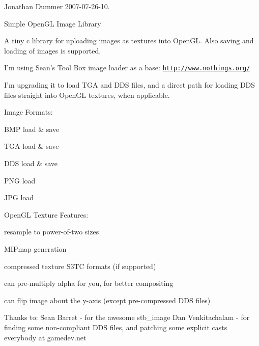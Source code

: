 Jonathan Dummer 2007-\/07-\/26-\/10.

Simple Open\+G\+L Image Library

A tiny c library for uploading images as textures into Open\+G\+L. Also saving and loading of images is supported.

I'm using Sean's Tool Box image loader as a base\+: \href{http://www.nothings.org/}{\tt http\+://www.\+nothings.\+org/}

I'm upgrading it to load T\+G\+A and D\+D\+S files, and a direct path for loading D\+D\+S files straight into Open\+G\+L textures, when applicable.

Image Formats\+:
\begin{DoxyItemize}
\item B\+M\+P load \& save
\item T\+G\+A load \& save
\item D\+D\+S load \& save
\item P\+N\+G load
\item J\+P\+G load
\end{DoxyItemize}

Open\+G\+L Texture Features\+:
\begin{DoxyItemize}
\item resample to power-\/of-\/two sizes
\item M\+I\+Pmap generation
\item compressed texture S3\+T\+C formats (if supported)
\item can pre-\/multiply alpha for you, for better compositing
\item can flip image about the y-\/axis (except pre-\/compressed D\+D\+S files)
\end{DoxyItemize}

Thanks to\+: Sean Barret -\/ for the awesome stb\+\_\+image Dan Venkitachalam -\/ for finding some non-\/compliant D\+D\+S files, and patching some explicit casts everybody at gamedev.\+net 